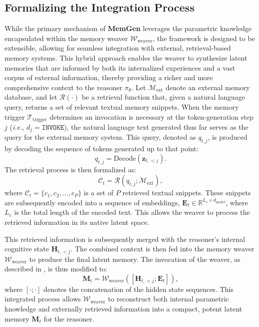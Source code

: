 \documentclass[]{fairmeta}
\newcommand{\ourmethod}{{\fontfamily{lmtt}\selectfont \textbf{MemGen}}\xspace}
\begin{document}
\subsection{Formalizing the Integration Process}
\vspace{-0.5em}
While the primary mechanism of \ourmethod leverages the parametric knowledge encapsulated within the memory weaver $\mathcal{W}_\text{weaver}$, the framework is designed to be extensible, allowing for seamless integration with external, retrieval-based memory systems. This hybrid approach enables the weaver to synthesize latent memories that are informed by both its internalized experiences and a vast corpus of external information, thereby providing a richer and more comprehensive context to the reasoner $\pi_\theta$. Let $\mathcal{M}_\text{ext}$ denote an external memory database, and let $\mathcal{R}(\cdot)$ be a retrieval function that, given a natural language query, returns a set of relevant textual memory snippets. When the memory trigger $\mathcal{T}_\text{trigger}$ determines an invocation is necessary at the token-generation step $j$ (\textit{i.e.}, $d_j = \texttt{INVOKE}$), the natural language text generated thus far serves as the query for the external memory system. This query, denoted as $q_{t,j}$, is produced by decoding the sequence of tokens generated up to that point:
\begin{equation}
q_{t,j} = \text{Decode}(\mathbf{z}_{t,<j}).
\end{equation}
The retrieval process is then formalized as:
\begin{equation}
\mathcal{C}_t = \mathcal{R}(q_{t,j}; \mathcal{M}_\text{ext}),
\end{equation}
where $\mathcal{C}_t = \{c_1, c_2, \ldots, c_P\}$ is a set of $P$ retrieved textual snippets. These snippets are subsequently encoded into a sequence of embeddings, $\mathbf{E}_t \in \mathbb{R}^{L_c \times d_\text{model}}$, where $L_c$ is the total length of the encoded text. This allows the weaver to process the retrieved information in its native latent space.

This retrieved information is subsequently merged with the reasoner's internal cognitive state $\mathbf{H}_{t,<j}$. The combined context is then fed into the memory weaver $\mathcal{W}_\text{weaver}$ to produce the final latent memory. The invocation of the weaver, as described in , is thus modified to:
\begin{equation}
\mathbf{M}_t = \mathcal{W}_\text{weaver}([\mathbf{H}_{t,<j}; \mathbf{E}_t]),
\end{equation}
where $[\cdot ; \cdot]$ denotes the concatenation of the hidden state sequences. This integrated process allows $\mathcal{W}_\text{weaver}$ to reconstruct both internal parametric knowledge and externally retrieved information into a compact, potent latent memory $\mathbf{M}_t$ for the reasoner.
\end{document}
